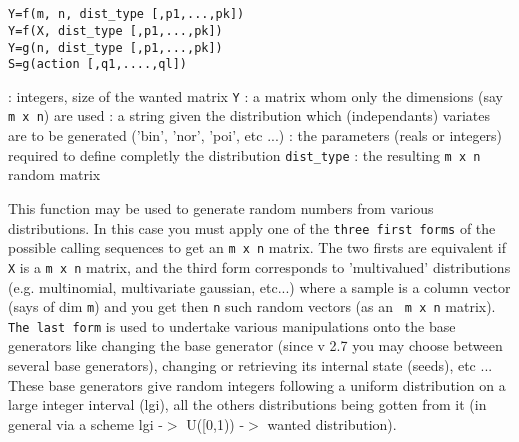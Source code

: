 
\begin{mandesc}
   \\
   \\
\end{mandesc}

\begin{calling_sequence}
\begin{verbatim}
Y=f(m, n, dist_type [,p1,...,pk])  
Y=f(X, dist_type [,p1,...,pk])  
Y=g(n, dist_type [,p1,...,pk])  
S=g(action [,q1,....,ql])  
\end{verbatim}
\end{calling_sequence}
\begin{parameters}
  \begin{varlist}
     : integers, size of the wanted matrix \verb!Y!
     : a matrix whom only the dimensions (say \verb!m x n!) are used
     : a string given the distribution which (independants) variates are to be 
    generated ('bin', 'nor', 'poi', etc ...)
     : the parameters (reals or integers) required to define completly the distribution 
    \verb!dist_type!
     : the resulting \verb!m x n! random matrix
  \end{varlist}
\end{parameters}

\begin{mandescription}
  This function may be used to generate random numbers from various distributions. In this 
  case you must apply one of the 
  \verb!three first forms! of the possible calling sequences to get an \verb!m x n! matrix. 
  The two firsts are equivalent if \verb!X! is a \verb!m x n! matrix, 
  and the third form corresponds to 'multivalued' distributions (e.g. multinomial, multivariate
  gaussian, etc...) where a sample is a column vector (says of dim \verb!m!)
  and you get then \verb!n! such random vectors (as an \verb! m x n! matrix). 
  \verb!The last form! is used to undertake various manipulations onto the base generators
  like changing the base generator (since v 2.7 you may choose between several base generators), 
  changing or retrieving its internal state (seeds), etc ... These base generators give random
  integers following a uniform distribution on a large integer interval (lgi), all the others 
  distributions being gotten from it (in general via a scheme lgi -$>$ U([0,1)) -$>$ wanted distribution).
\end{mandescription}

